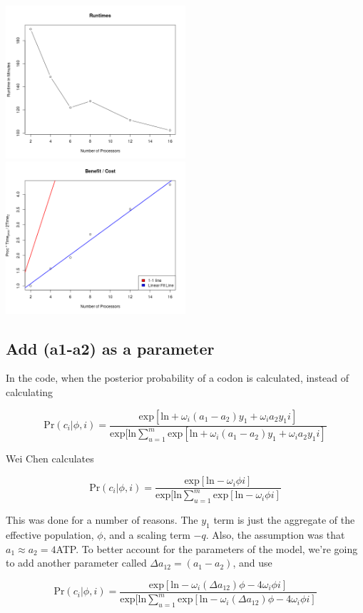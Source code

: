 \includegraphics[width=0.5\textwidth]{data/1105runtimes.png}
\includegraphics[width=0.5\textwidth]{data/1105timingCostBenefit.png}


\subsection{Add (a1-a2) as a parameter}

In the code, when the posterior probability of a codon is calculated, instead of calculating

\[
\mbox{Pr}(c_i|\phi,i)
=
\frac{
\mbox{exp}[\mbox{ln}
+ \omega_i(a_1-a_2)y_1
+ \omega_ia_2y_1 i
]
}{
\mbox{exp}[\mbox{ln}
\sum_{u=1}^m
\mbox{exp}[\mbox{ln}
+ \omega_i(a_1-a_2)y_1
+ \omega_ia_2y_1 i
]
}
\]

Wei Chen calculates

\[
\mbox{Pr}(c_i|\phi,i)
=
\frac{
\mbox{exp}[\mbox{ln}
- \omega_i\phi i
]
}{
\mbox{exp}[\mbox{ln}
\sum_{u=1}^m
\mbox{exp}[\mbox{ln}
- \omega_i\phi i
]
}
\]

This was done for a number of reasons. The $y_1$ term is just the aggregate of the effective population, $\phi$, and a scaling term $-q$. Also, the assumption was that $a_1 \approx a_2 = 4$ATP.
To better account for the parameters of the model, we're going to add another parameter called $\Delta a_{12} = (a_1 - a_2)$, and use

\[
\mbox{Pr}(c_i|\phi,i)
=
\frac{
\mbox{exp}[\mbox{ln}
- \omega_i(\Delta a_{12})\phi
- 4\omega_i\phi i
]
}{
\mbox{exp}[\mbox{ln}
\sum_{u=1}^m
\mbox{exp}[\mbox{ln}
- \omega_i(\Delta a_{12})\phi
- 4\omega_i\phi i
]
}
\]

